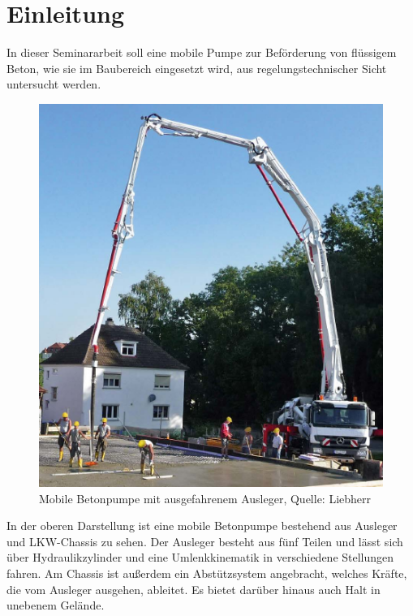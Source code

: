 \chapter{Einleitung}

In dieser Seminararbeit soll eine mobile Pumpe zur Beförderung von flüssigem Beton, wie sie im Baubereich eingesetzt wird, aus regelungstechnischer Sicht untersucht werden.

\begin{figure}[h!]
\centering
\includegraphics[scale=0.6]{betonpumpe.png}
\caption{Mobile Betonpumpe mit ausgefahrenem Ausleger, Quelle: Liebherr}
\end{figure}

In der oberen Darstellung ist eine mobile Betonpumpe bestehend aus Ausleger und LKW-Chassis zu sehen. Der Ausleger besteht aus fünf Teilen und lässt sich über Hydraulikzylinder und eine Umlenkkinematik in verschiedene Stellungen fahren. Am Chassis ist außerdem ein  Abstützsystem angebracht, welches Kräfte, die vom Ausleger ausgehen, ableitet. Es bietet darüber hinaus auch Halt in unebenem Gelände.\\

